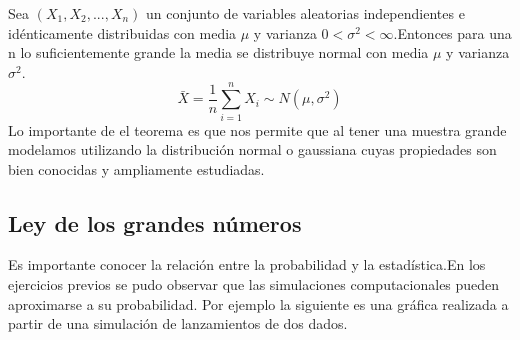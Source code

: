 \documentclass{article}
\begin{document}
Sea $(X_1,X_2, ...,X_n)$ un conjunto de variables aleatorias independientes e idénticamente distribuidas con media $\mu$ y varianza $0 < \sigma^2 < \infty $.Entonces para una n lo suficientemente grande la media se distribuye  normal con media $\mu$ y varianza $\sigma^2$. $$\bar{X} = \frac{1}{n}\sum_{i=1}^{n}X_i \sim N(\mu,\sigma^2)$$
Lo importante de el teorema es que nos permite que al tener una muestra grande modelamos utilizando la distribución normal o gaussiana cuyas propiedades son bien conocidas y ampliamente estudiadas.
\subsection{Ley de los grandes números}
Es importante conocer la relación entre la probabilidad y la estadística.En los ejercicios previos se pudo observar que las simulaciones computacionales pueden aproximarse a su probabilidad.
Por ejemplo la siguiente es una gráfica realizada a partir de una simulación de lanzamientos de dos dados.
\end{document}
